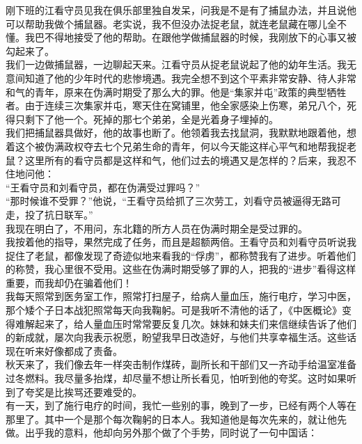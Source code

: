 刚下班的江看守员见我在俱乐部里独自发呆，问我是不是有了捕鼠办法，并且说他可以帮助我做个捕鼠器。老实说，我不但没办法捉老鼠，就连老鼠藏在哪儿全不懂。我巴不得地接受了他的帮助。在跟他学做捕鼠器的时候，我刚放下的心事又被勾起来了。\\

我们一边做捕鼠器，一边聊起天来。江看守员从捉老鼠说起了他的幼年生活。我无意间知道了他的少年时代的悲惨境遇。我完全想不到这个平素非常安静、待人非常和气的青年，原来在伪满时期受了那么大的罪。他是“集家并屯”政策的典型牺牲者。由于连续三次集家并屯，寒天住在窝铺里，他全家感染上伤寒，弟兄八个，死得只剩下了他一个。死掉的那七个弟弟，全是光着身子埋掉的。\\

我们把捕鼠器具做好，他的故事也断了。他领着我去找鼠洞，我默默地跟着他，想着这个被伪满政权夺去七个兄弟生命的青年，何以今天能这样心平气和地帮我捉老鼠？这里所有的看守员都是这样和气，他们过去的境遇又是怎样的？后来，我忍不住地问他：\\

“王看守员和刘看守员，都在伪满受过罪吗？”\\

“那时候谁不受罪？”他说，“王看守员给抓了三次劳工，刘看守员被逼得无路可走，投了抗日联军。”\\

我现在明白了，不用问，东北籍的所方人员在伪满时期全是受过罪的。\\

我按着他的指导，果然完成了任务，而且是超额两倍。王看守员和刘看守员听说我捉住了老鼠，都像发现了奇迹似地来看我的“俘虏”，都称赞我有了进步。听着他们的称赞，我心里很不受用。这些在伪满时期受够了罪的人，把我的“进步”看得这样重要，而我却仍在骗着他们！\\

我每天照常到医务室工作，照常打扫屋子，给病人量血压，施行电疗，学习中医，那个矮个子日本战犯照常每天向我鞠躬。可是我听不清他的话了，《中医概论》变得难解起来了，给人量血压时常常要反复几次。妹妹和妹夫们来信继续告诉了他们的新成就，屡次向我表示祝愿，盼望我早日改造好，与他们共享幸福生活。这些话现在听来好像都成了责备。\\

秋天来了，我们像去年一样突击制作煤砖，副所长和干部们又一齐动手给温室准备过冬燃料。我尽量多抬煤，却尽量不想让所长看见，怕听到他的夸奖。这时如果听到了夸奖是比挨骂还要难受的。\\

有一天，到了施行电疗的时间，我忙一些别的事，晚到了一步，已经有两个人等在那里了。其中一个是那个每次鞠躬的日本人。我知道他是每次先来的，就让他先做。出乎我的意料，他却向另外那个做了个手势，同时说了一句中国话：\\

